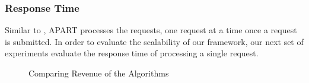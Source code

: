 \subsubsection{Response Time}

Similar to \cite{Ma13,Huang14}, APART processes the requests, one request at a time once a request is submitted. In order to evaluate the scalability of our framework, our next set of experiments evaluate the response time of processing a single request. 

\begin{figure}[h]
    \centering
    \vspace{-0.15in}
    \caption{Comparing Revenue of the Algorithms}
    \label{fig:rp}
\end{figure}

